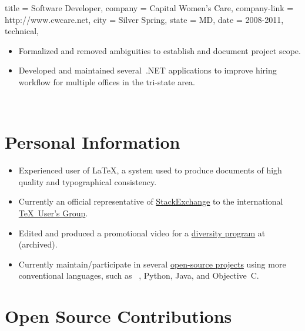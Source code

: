 \documentclass{simplecv}
\newif\ifgithub
\begin{document}
\begin{position}
  {
    title   = Software Developer,
    company = Capital Women's Care,
    company-link = http://www.cwcare.net,
    city    = Silver Spring,
    state   = MD,
    date    = 2008-2011,
    technical,
  }

\begin{itemize}
\item Formalized and removed ambiguities to establish and document project scope.
\item Developed and maintained several \CSharp\,.NET applications to
  improve hiring workflow for multiple offices in the tri-state area.
\end{itemize}
\end{position}
\vfill \vfill \vfill \vfill %

\newpage
~\vfill
\section{Personal Information}
\begin{itemize}
\item Experienced user of \LaTeX, a system used to produce documents
  of high quality and typographical consistency.
\item Currently an official representative of
  \href{http://meta.tex.stackexchange.com/a/4174/17423}{StackExchange}
  to the international \href{http://www.tug.org}{\TeX\ User's Group}.
\item Edited and produced a promotional video for a \href{http://www.smcm.edu/desousabrent}{diversity program} at  (archived).
\item Currently maintain\slash participate in several
  \href{http://www.github.com/vermiculus}{open-source projects}
  using more conventional languages, such as
  ~\Lisp, Python, Java, and Objective~C.
\end{itemize}

\ifgithub
\vfill\vfill
\section{Open Source Contributions \hfill {}}
\end{document}
